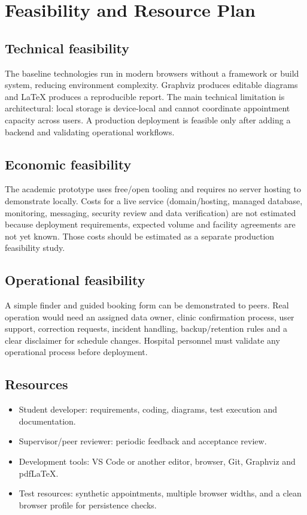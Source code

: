 \documentclass[11pt,a4paper]{article}
\begin{document}
\section{Feasibility and Resource Plan}
\subsection{Technical feasibility}
The baseline technologies run in modern browsers without a framework or build system, reducing environment complexity. Graphviz produces editable diagrams and LaTeX produces a reproducible report. The main technical limitation is architectural: local storage is device-local and cannot coordinate appointment capacity across users. A production deployment is feasible only after adding a backend and validating operational workflows.

\subsection{Economic feasibility}
The academic prototype uses free/open tooling and requires no server hosting to demonstrate locally. Costs for a live service (domain/hosting, managed database, monitoring, messaging, security review and data verification) are not estimated because deployment requirements, expected volume and facility agreements are not yet known. Those costs should be estimated as a separate production feasibility study.

\subsection{Operational feasibility}
A simple finder and guided booking form can be demonstrated to peers. Real operation would need an assigned data owner, clinic confirmation process, user support, correction requests, incident handling, backup/retention rules and a clear disclaimer for schedule changes. Hospital personnel must validate any operational process before deployment.

\subsection{Resources}
\begin{itemize}
  \item Student developer: requirements, coding, diagrams, test execution and documentation.
  \item Supervisor/peer reviewer: periodic feedback and acceptance review.
  \item Development tools: VS Code or another editor, browser, Git, Graphviz and pdfLaTeX.
  \item Test resources: synthetic appointments, multiple browser widths, and a clean browser profile for persistence checks.
\end{itemize}
\end{document}
